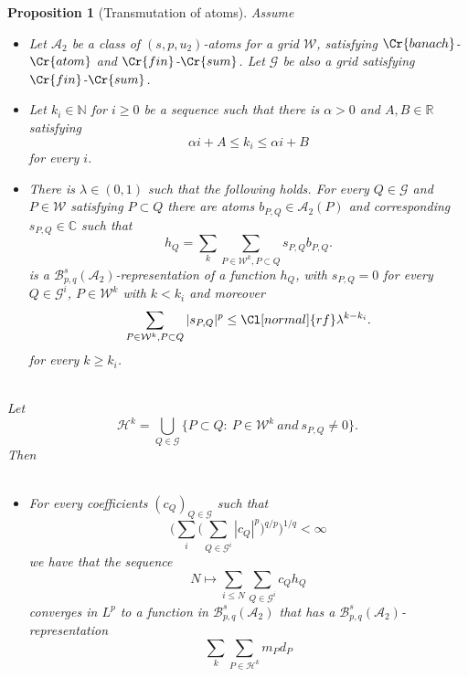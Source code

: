 \documentclass{amsart}
\newtheorem{proposition}[theorem]{Proposition}
\theoremstyle{definition}
\newcommand{\Cll}[2][normal]{\Cl[#1]{#2}}
\newcommand{\Crr}[1]{\Cr{#1}}
\begin{document}
\begin{proposition}[Transmutation of atoms] \label{trans} Assume  \\ 

\begin{itemize}
\item[{\bf I.}] Let  $\mathcal{A}_2$    be  a class of $(s,p,u_2)$-atoms  for  a grid  $\mathcal{W}$, satisfying  ${\Crr{banach}}$-${\Crr{atom}}$ and ${\Crr{fin}}$-${\Crr{sum}}$. Let $\mathcal{G}$ be also a  grid satisfying ${\Crr{fin}}$-${\Crr{sum}}$.
\item[{\bf II.}] Let $k_i\in \mathbb{N}$ for $i\geq 0$ be a sequence such that there is  $\alpha > 0 $ and $A, B\in \mathbb{R}$ satisfying
$$ \alpha i +A    \leq   k_i\leq \alpha i +B $$
for every $i$.
\item[{\bf III.}] There is $\lambda \in(0,1)$ such that the following holds. For every $Q\in \mathcal{G}$ and $P\in \mathcal{W}$ satisfying $P\subset Q$ there  are atoms $b_{P,Q} \in \mathcal{A}_2(P)$ and  corresponding $s_{P,Q}\in \mathbb{C}$ such that 
$$h_Q=\sum_k  \sum_{P\in \mathcal{W}^k, P\subset Q} s_{P,Q} b_{P,Q}.$$
is a  $\mathcal{B}^s_{p,q}(\mathcal{A}_2)$-representation of a function $h_Q$, with $s_{P,Q}=0$ for every $Q\in \mathcal{G}^i$,  $P \in \mathcal{W}^k$ with $k < k_i$  and moreover
\begin{equation}\label{ad}  \sum_{P\in \mathcal{W}^k, P \subset Q} |s_{P,Q}|^p   \leq \Cll{rf}  \lambda^{k-k_i}.\end{equation}
for every $k\geq k_i$.  \\ \\
\end{itemize}
Let
$$\mathcal{H}^k= \bigcup_{Q\in \mathcal{G}} \{ P \subset Q\colon \ P\in \mathcal{W}^k \ and  \ s_{P,Q}\neq 0      \}. $$
Then  \\ \\
\begin{itemize}
\item[{\bf A.}] For every coefficients $(c_Q)_{Q\in \mathcal{G}}$ such that 
$$\big( \sum_i  \big( \sum_{Q\in \mathcal{G}^i}  |c_{Q}|^p  \big)^{q/p}\big)^{1/q}<\infty$$
we have that the sequence
\begin{equation}\label{seq33} N\mapsto \sum_{i\leq N} \sum_{Q\in \mathcal{G}^i }c_Q h_Q\end{equation}
converges in $L^p$ to a function in $\mathcal{B}^s_{p,q}(\mathcal{A}_2)$ that has a $\mathcal{B}^s_{p,q}(\mathcal{A}_2)$-representation 
\begin{equation}\label{cs} \sum_k \sum_{P\in \mathcal{H}^k}     m_P d_P\end{equation}

\end{itemize}
\end{proposition}
\end{document}
